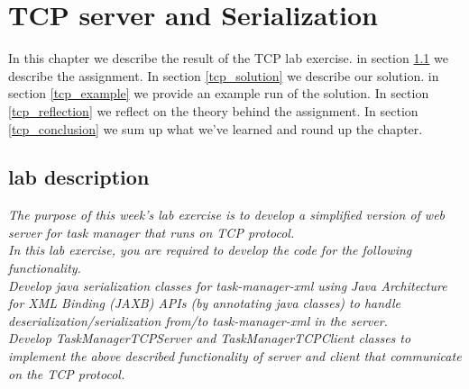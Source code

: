 \chapter{TCP server and Serialization}
\minitoc


In this chapter we describe the result of the TCP lab exercise. in section \ref{tcp_lab} we describe the assignment. In section \ref{tcp_solution} we describe our solution. in section \ref{tcp_example} we provide an example run of the solution. In section \ref{tcp_reflection} we reflect on the theory behind the assignment. In section \ref{tcp_conclusion} we sum up what we've learned and round up the chapter.

\section{lab description}
\label{tcp_lab}
\textit{The purpose of this week’s lab exercise is to develop a simplified version of web server for task manager that runs on TCP protocol.}\\

\textit{In this lab exercise, you are required to develop the code for the following functionality.}\\

\textit{Develop java serialization classes for task-manager-xml using Java Architecture for XML Binding (JAXB) APIs (by annotating java classes) to handle deserialization/serialization from/to task-manager-xml in the server.}\\

\textit{Develop TaskManagerTCPServer and TaskManagerTCPClient classes to implement the above described functionality of server and client that communicate on the TCP protocol.}\\


\begin{comment}
[Optional] The server described above can only handle one single client at a time in each run. In order to make the server more robust and handle multiple clients concurrently, one may follow the approach suggested in the page. 173 of the course textbook [DS], to create a new connection for every client request that will run on a separate thread. Therefore, develop a TaskManagerTCPServer that can handle multiple concurrent clients.\\

[Optional] The functionality of TaskManagerTCPServer can be extended to offer more commands (e.g. OPTIONS, HEAD) similar to the HTTP protocol. In case of OPTIONS command, one may describe the list of commands offered by the server, where as for HEAD, one may only provide the number of tasks available for a given attendant instead of sending all the available tasks to the client.\\

\end{comment}



